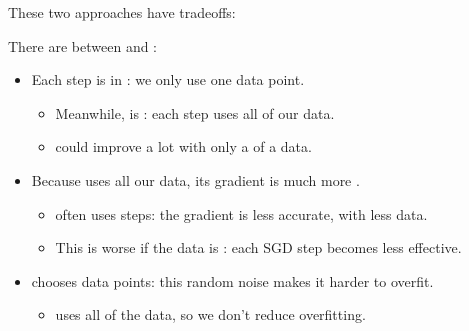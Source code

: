             These two approaches have tradeoffs:\\
            
            \begin{concept}
                There are  between  and :
                
                \begin{itemize}
                    \item Each step is  in : we only use one data point. 
                        \begin{itemize}
                            \item Meanwhile,  is : each step uses all of our data.
                            \item {} could improve a lot with only a  of a data.
                        \end{itemize}

                        \subsecdiv
                        
                    \item Because  uses all our data, its gradient is much more .
                        \begin{itemize}
                            \item {} often uses  steps: the gradient is less accurate, with less data.
                            \item This is worse if the data is : each SGD step becomes less effective.
                        \end{itemize}

                        \subsecdiv
                        
                    \item {}  chooses data points: this random noise makes it harder to overfit.
                        \begin{itemize}
                            \item {} uses all of the data, so we don't reduce overfitting.
                        \end{itemize}
                \end{itemize}
            \end{concept}
        
        \subsecdiv
        
